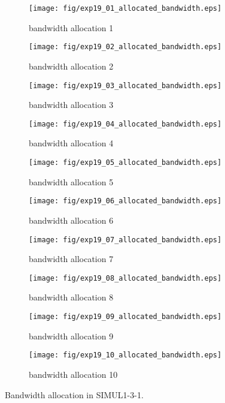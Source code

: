 	\begin{figure}
		\begin{center}
			\begin{subfigure}[b]{0.32\textwidth}
				\texttt{[image: fig/exp19\_01\_allocated\_bandwidth.eps]}
				\caption{bandwidth allocation 1}
				\label{figure:simul1_3_1_b_a}
			\end{subfigure}
			\begin{subfigure}[b]{0.32\textwidth}
				\texttt{[image: fig/exp19\_02\_allocated\_bandwidth.eps]}
				\caption{bandwidth allocation 2}
				\label{figure:simul1_3_1_b_b}
			\end{subfigure}
			\begin{subfigure}[b]{0.32\textwidth}
				\texttt{[image: fig/exp19\_03\_allocated\_bandwidth.eps]}
				\caption{bandwidth allocation 3}
				\label{figure:simul1_3_1_b_c}
			\end{subfigure}
			\begin{subfigure}[b]{0.32\textwidth}
				\texttt{[image: fig/exp19\_04\_allocated\_bandwidth.eps]}
				\caption{bandwidth allocation 4}
				\label{figure:simul1_3_1_b_d}
			\end{subfigure}
			\begin{subfigure}[b]{0.32\textwidth}
				\texttt{[image: fig/exp19\_05\_allocated\_bandwidth.eps]}
				\caption{bandwidth allocation 5}
				\label{figure:simul1_3_1_b_e}
			\end{subfigure}
			\begin{subfigure}[b]{0.32\textwidth}
				\texttt{[image: fig/exp19\_06\_allocated\_bandwidth.eps]}
				\caption{bandwidth allocation 6}
				\label{figure:simul1_3_1_b_f}
			\end{subfigure}
			\begin{subfigure}[b]{0.32\textwidth}
				\texttt{[image: fig/exp19\_07\_allocated\_bandwidth.eps]}
				\caption{bandwidth allocation 7}
				\label{figure:simul1_3_1_b_g}
			\end{subfigure}
			\begin{subfigure}[b]{0.32\textwidth}
				\texttt{[image: fig/exp19\_08\_allocated\_bandwidth.eps]}
				\caption{bandwidth allocation 8}
				\label{figure:simul1_3_1_b_h}
			\end{subfigure}
			\begin{subfigure}[b]{0.32\textwidth}
				\texttt{[image: fig/exp19\_09\_allocated\_bandwidth.eps]}
				\caption{bandwidth allocation 9}
				\label{figure:simul1_3_1_b_i}
			\end{subfigure}
			\begin{subfigure}[b]{0.32\textwidth}
				\texttt{[image: fig/exp19\_10\_allocated\_bandwidth.eps]}
				\caption{bandwidth allocation 10}
				\label{figure:simul1_3_1_b_j}
			\end{subfigure}
			\caption{Bandwidth allocation in SIMUL1-3-1.}
			\label{figure:simul1_3_1_ba}
		\end{center}
	\end{figure}
	
